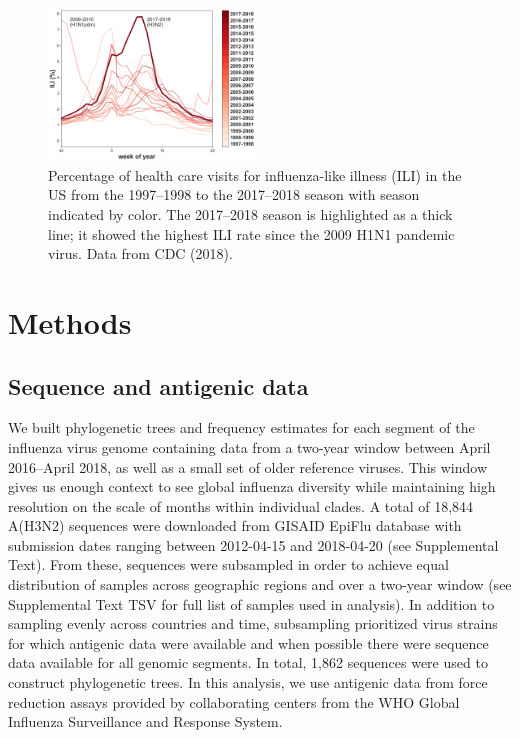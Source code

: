 \begin{figure}[t]
    \begin{center}
    \includegraphics[width=0.49\textwidth]{figures/ili_1997_2018.png}
    \end{center}
    \caption{Percentage of health care visits for influenza-like illness (ILI) in the US from the 1997--1998 to the 2017--2018 season with season indicated by color. The 2017--2018 season is highlighted as a thick line; it showed the highest ILI rate since the 2009 H1N1 pandemic virus. Data from CDC (2018).}
    \label{fig:ili}
\end{figure}

\section*{Methods}
\subsection*{Sequence and antigenic data}
We built phylogenetic trees and frequency estimates for each segment of the influenza virus genome containing data from a two-year window between April 2016--April 2018, as well as a small set of older reference viruses.
This window gives us enough context to see global influenza diversity while maintaining high resolution on the scale of months within individual clades.
A total of 18,844 A(H3N2) sequences were downloaded from GISAID EpiFlu database with submission dates ranging between 2012-04-15 and 2018-04-20 (see Supplemental Text).
From these, sequences were subsampled in order to achieve equal distribution of samples across geographic regions and over a two-year window (see Supplemental Text TSV for full list of samples used in analysis).
In addition to sampling evenly across countries and time, subsampling prioritized virus strains for which antigenic data were available and when possible there were sequence data available for all genomic segments.
In total, 1,862 sequences were used to construct phylogenetic trees.
In this analysis, we use antigenic data from force reduction assays provided by collaborating centers from the WHO Global Influenza Surveillance and Response System.

